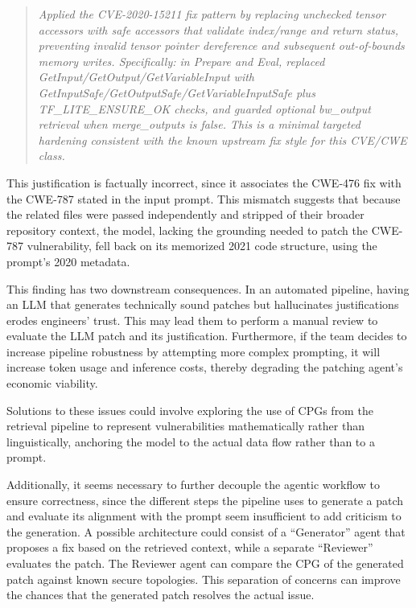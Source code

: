 \begin{quote}
\textit{Applied the CVE-2020-15211 fix pattern by replacing unchecked tensor accessors with safe accessors that validate index/range and return status, preventing invalid tensor pointer dereference and subsequent out-of-bounds memory writes. Specifically: in Prepare and Eval, replaced GetInput/GetOutput/GetVariableInput with GetInputSafe/GetOutputSafe/GetVariableInputSafe plus TF\_LITE\_ENSURE\_OK checks, and guarded optional bw\_output retrieval when merge\_outputs is false. This is a minimal targeted hardening consistent with the known upstream fix style for this CVE/CWE class.}
\end{quote}

This justification is factually incorrect, since it associates the CWE-476 fix with the CWE-787 stated in the input prompt. 
This mismatch suggests that because the related files were passed independently and stripped of their broader repository context, the model, lacking the grounding needed to patch the CWE-787 vulnerability, fell back on its memorized 2021 code structure, using the prompt's 2020 metadata.

This finding has two downstream consequences. In an automated pipeline, having an LLM that generates technically sound patches but hallucinates justifications erodes engineers' trust. This may lead them to perform a manual review to evaluate the LLM patch and its justification. Furthermore, if the team decides to increase pipeline robustness by attempting more complex prompting, it will increase token usage and inference costs, thereby degrading the patching agent's economic viability.

Solutions to these issues could involve exploring the use of CPGs from the retrieval pipeline to represent vulnerabilities mathematically rather than linguistically, anchoring the model to the actual data flow rather than to a prompt.

Additionally, it seems necessary to further decouple the agentic workflow to ensure correctness, since the different steps the pipeline uses to generate a patch and evaluate its alignment with the prompt seem insufficient to add criticism to the generation.
A possible architecture could consist of a ``Generator'' agent that proposes a fix based on the retrieved context, while a separate ``Reviewer'' evaluates the patch. The Reviewer agent can compare the CPG of the generated patch against known secure topologies. This separation of concerns can improve the chances that the generated patch resolves the actual issue.

